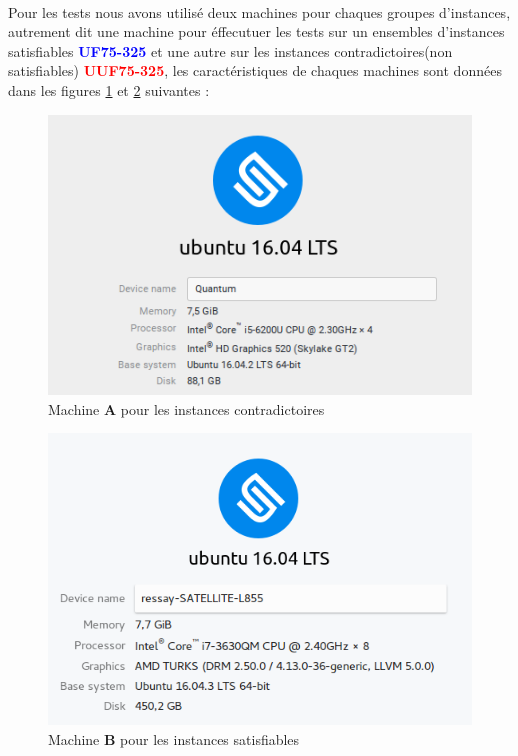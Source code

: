 \paragraph{}
Pour les tests nous avons utilisé deux machines pour chaques groupes d'instances, autrement dit une machine pour éffecutuer les tests sur un ensembles d'instances satisfiables \textbf{\textcolor{blue}{UF75-325}}\cite{Benchmark} et une autre sur les instances contradictoires(non satisfiables) \textbf{\textcolor{red}{UUF75-325}}\cite{Benchmark}, les caractéristiques de chaques machines sont données dans les figures \ref{fig:machineA} et \ref{fig:machineB} suivantes : 
\begin{figure}[H]
	\centering
	\includegraphics[scale=0.75]{images/machineWISS.png}
	\caption{Machine \textbf{A} pour les instances contradictoires}
	\label{fig:machineA}
\end{figure}
\begin{figure}[H]
	\centering
	\includegraphics[scale=0.665]{images/machineYASSER.png}
	\caption{Machine \textbf{B} pour les instances satisfiables}
	\label{fig:machineB}
\end{figure}
\newpage
